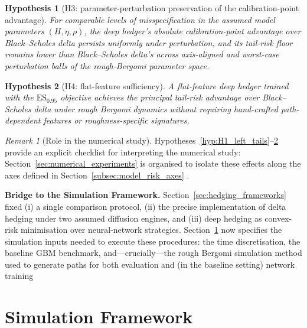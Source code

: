 \documentclass[12pt,a4paper]{article}
\theoremstyle{definition}
\theoremstyle{plain}
\newtheorem{hypothesis}{Hypothesis}
\theoremstyle{remark}
\newtheorem{remark}{Remark}[section]
\theoremstyle{plain}
\begin{document}
\begin{hypothesis}[H3: parameter-perturbation preservation of the calibration-point advantage]\label{hyp:H3_param_robustness}
For comparable levels of misspecification in the assumed model parameters $(H, \eta, \rho)$, the deep hedger's absolute calibration-point advantage over Black--Scholes delta persists uniformly under perturbation, and its tail-risk floor remains lower than Black--Scholes delta's across axis-aligned and worst-case perturbation balls of the rough-Bergomi parameter space.
\end{hypothesis}

\begin{hypothesis}[H4: flat-feature sufficiency]\label{hyp:H4_state_compression}
A flat-feature deep hedger trained with the $\mathrm{ES}_{0.95}$ objective achieves the principal tail-risk advantage over Black--Scholes delta under rough Bergomi dynamics without requiring hand-crafted path-dependent features or roughness-specific signatures.
\end{hypothesis}

\begin{remark}[Role in the numerical study]
\label{rem:hypotheses_role}
Hypotheses~\ref{hyp:H1_left_tails}--\ref{hyp:H4_state_compression} provide an explicit checklist for interpreting the numerical study:
Section~\ref{sec:numerical_experiments} is organised to isolate these effects along the axes defined in Section~\ref{subsec:model_risk_axes} \cite{ElKaroui1998Robustness,Horvath2021DeepRough}.
\end{remark}

\medskip

\noindent
\textbf{Bridge to the Simulation Framework.}
Section~\ref{sec:hedging_frameworks} fixed (i) a single comparison protocol, (ii) the precise implementation of delta hedging
under two assumed diffusion engines, and (iii) deep hedging as convex-risk minimisation over neural-network strategies.
Section~\ref{sec:simulation_framework} now specifies the simulation inputs needed to execute these procedures:
the time discretisation, the baseline GBM benchmark, and---crucially---the rough Bergomi simulation method used to generate paths for both
evaluation and (in the baseline setting) network training \cite{BayerFriz2016,Horvath2021DeepRough}


\newpage

\section{Simulation Framework}
\label{sec:simulation_framework}
\end{document}
